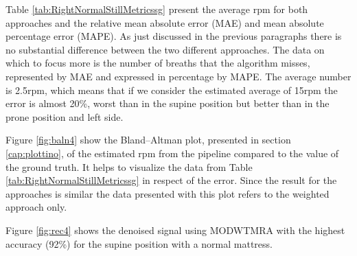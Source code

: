 \vspace{1cm}
%


\vspace{0.5cm}

Table \ref{tab:RightNormalStillMetricssg} present the average rpm for both approaches  
and the relative mean absolute error (MAE) and mean absolute percentage error (MAPE). As just discussed in the previous paragraphs there is no substantial difference between the two different approaches. The data on which to focus more is the number of breaths that the algorithm misses, represented by MAE and expressed in percentage by MAPE. The average number is 2.5rpm, which means that if we consider the estimated average of 15rpm the error is almost 20\%, worst than in the supine position but better than in the prone position and left side.

\vspace{1cm}

\vspace{0.5cm}

Figure \ref{fig:baln4} show the Bland–Altman plot, presented in section \ref{cap:plottino}, of the estimated rpm from the pipeline compared to the value of the ground truth. It helps to visualize the data from Table \ref{tab:RightNormalStillMetricssg} in respect of the error. Since the result for the approaches is similar the data presented with this plot refers to the weighted approach only.

Figure \ref{fig:rec4} shows the denoised signal using MODWTMRA with the highest accuracy (92\%) for the supine position with a normal mattress.

